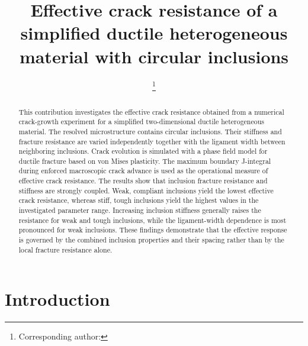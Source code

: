 \documentclass[pamm,a4paper,fleqn]{w-art}
\begin{document}
\TitleLanguage[EN]
\title[Effective crack resistance with circular inclusions]%
{Effective crack resistance of a simplified ductile
  heterogeneous material with circular inclusions}

\author{ %
  \footnote{Corresponding author:
    }}

\author{ }
\author{ }

\address[\inst{1}]{\CountryCode[DE]Institut f\"ur Mechanik,
  FB Bau- und Umweltingenieurwissenschaften, TU Darmstadt,
  Franziska-Braun-Stra{\ss}e 7, 64287 Darmstadt, Germany}

\AbstractLanguage[EN]
\begin{abstract}
  This contribution investigates the effective crack resistance
  obtained from a numerical crack-growth experiment for a simplified
  two-dimensional ductile heterogeneous material. The resolved
  microstructure contains circular inclusions. Their stiffness and
  fracture resistance are varied independently together with the
  ligament width between neighboring inclusions. Crack evolution is
  simulated with a phase field model for ductile fracture based on
  von Mises plasticity. The maximum boundary J-integral during
  enforced macroscopic crack advance is used as the operational
  measure of effective crack resistance. The results show that
  inclusion fracture resistance and stiffness are strongly coupled.
  Weak, compliant inclusions yield the lowest effective crack
  resistance, whereas stiff, tough inclusions yield the highest
  values in the investigated parameter range. Increasing inclusion
  stiffness generally raises the resistance for weak and tough
  inclusions, while the ligament-width dependence is most pronounced
  for weak inclusions. These findings demonstrate that the effective
  response is governed by the combined inclusion properties and their
  spacing rather than by the local fracture resistance alone.
\end{abstract}

\maketitle
\raggedbottom

\section{Introduction}\label{sec:intro}
\end{document}
